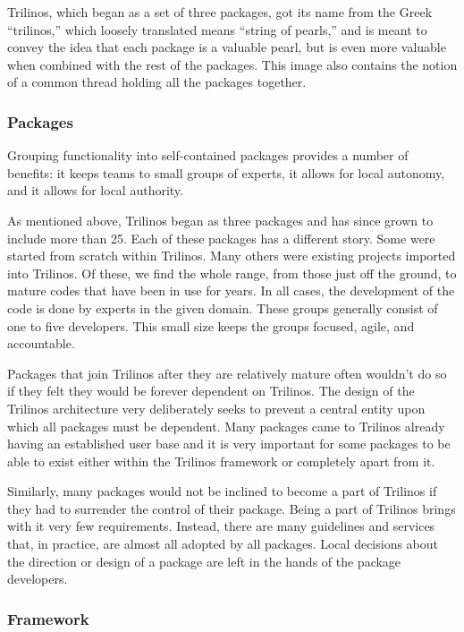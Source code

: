 \documentclass[12pt,relax]{article}
\begin{document}
Trilinos, which began as a set of three packages, got its name from the Greek
``trilinos,'' which loosely translated means ``string of pearls,'' and is
meant to convey the idea that each package is a valuable pearl, but is even
more valuable when combined with the rest of the packages.  This image also
contains the notion of a common thread holding all the packages together.

  \subsubsection{Packages}
  
  Grouping functionality into self-contained packages provides a number of
  benefits:  it keeps teams to small groups of experts, it allows for local
  autonomy, and it allows for local authority.
  
  As mentioned above, Trilinos began as three packages and has since grown to 
  include more than 25.  Each of these packages has a different story.  Some
  were started from scratch within Trilinos.  Many others were existing
  projects imported into Trilinos.  Of these, we find the whole range, from
  those just off the ground, to mature codes that have been in use for years.
  In all cases, the development of the code is done by experts in the given
  domain.  These groups generally consist of one to five developers.  This
  small size keeps the groups focused, agile, and accountable.
    
  Packages that join Trilinos after they are relatively mature often wouldn't
  do so if they felt they would be forever dependent on Trilinos.  The design
  of the Trilinos architecture very deliberately seeks to prevent a central
  entity upon which all packages must be dependent.  Many packages came to 
  Trilinos already having an established user base and it is very important
  for some packages to be able to exist either within the Trilinos framework
  or completely apart from it.
  
  Similarly, many packages would not be inclined to become a part of Trilinos
  if they had to surrender the control of their package.  Being a part of
  Trilinos brings with it very few requirements.  Instead, there are many
  guidelines and services that, in practice, are almost all adopted by all
  packages.  Local decisions about the direction or design of a package are
  left in the hands of the package developers.

  \subsubsection{Framework}
  
\end{document}
